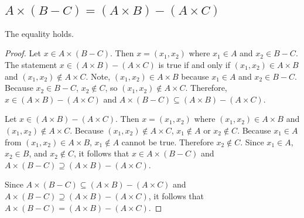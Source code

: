 \subsection{$A \times (B-C) = (A \times B) - (A \times C)$}
The equality holds.
\begin{proof} 
    Let $x \in A \times (B-C)$. 
    Then $x = (x_1, x_2)$ where $x_1 \in A$ and $x_2 \in B-C$.
    The statement $x \in (A \times B) - (A \times C)$ 
    is true if and only if 
    $(x_1, x_2) \in A \times B$ and $(x_1, x_2) \not\in A \times C$.
    Note, $(x_1, x_2) \in A \times B$ because $x_1 \in A$ and $x_2 \in B-C$.
    Because $x_2 \in B-C$, $x_2 \not\in C$, so $(x_1, x_2) \not\in A \times C$.
    Therefore, $x \in (A \times B) - (A \times C)$ and
    $A \times (B-C) \subseteq (A \times B) - (A \times C)$.\gap

    Let $x \in (A \times B) - (A \times C)$. 
    Then $x = (x_1, x_2)$ where 
    $(x_1, x_2) \in A \times B$ and $(x_1, x_2) \not\in A \times C$.
    Because $(x_1, x_2) \not\in A \times C$, 
    $x_1 \not\in A$ or $x_2 \not\in C$.
    Because $x_1 \in A$ from $(x_1, x_2) \in A \times B$,
    $x_1 \not\in A$ cannot be true. 
    Therefore $x_2 \not\in C$.
    Since $x_1 \in A$, $x_2 \in B$, and $x_2 \not\in C$, 
    it follows that 
    $x \in A \times (B-C)$ and
    $A \times (B-C) \supseteq (A \times B) - (A \times C)$.\gap
    
    Since $A \times (B-C) \subseteq (A \times B) - (A \times C)$ and
    $A \times (B-C) \supseteq (A \times B) - (A \times C)$,
    it follows that 
    $A \times (B-C) = (A \times B) - (A \times C)$.
\end{proof}